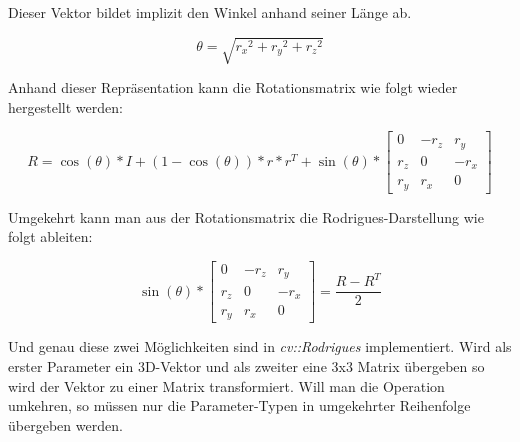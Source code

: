 Dieser Vektor bildet implizit den Winkel anhand seiner Länge ab.

\begin{equation}
\theta = \sqrt{{r_x}^2 + {r_y}^2 + {r_z}^2}
\end{equation}

Anhand dieser Repräsentation kann die Rotationsmatrix wie folgt wieder hergestellt werden:

\begin{equation}
R = \cos(\theta) * I + (1 - \cos(\theta)) * r * r^T + \sin(\theta) * 
\begin{bmatrix}
0 & -r_z & r_y \\
r_z & 0 & -r_x \\
r_y & r_x & 0
\end{bmatrix}
\end{equation}

Umgekehrt kann man aus der Rotationsmatrix die Rodrigues-Darstellung wie folgt ableiten:

\begin{equation}
\sin(\theta) * 
\begin{bmatrix}
0 & -r_z & r_y \\
r_z & 0 & -r_x \\
r_y & r_x & 0
\end{bmatrix}
= 
\frac{R - R^T}{2}
\end{equation}

Und genau diese zwei Möglichkeiten sind in \textit{cv::Rodrigues} implementiert. Wird als erster Parameter ein 3D-Vektor und als zweiter eine 3x3 Matrix übergeben so wird der Vektor zu einer Matrix transformiert. Will man die Operation umkehren, so müssen nur die Parameter-Typen in umgekehrter Reihenfolge übergeben werden.
